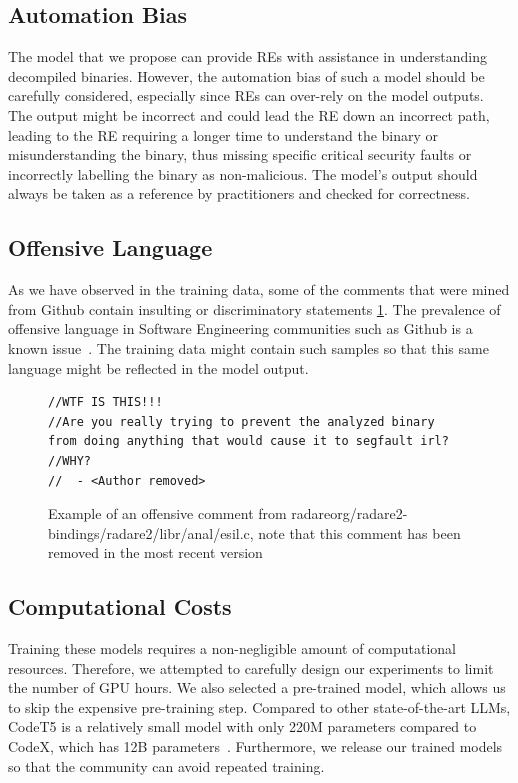 \subsection{Automation Bias}
The model that we propose can provide REs with assistance in understanding decompiled binaries. However, the automation bias of such a model should be carefully considered, especially since REs can over-rely on the model outputs. The output might be incorrect and could lead the RE down an incorrect path, leading to the RE requiring a longer time to understand the binary or misunderstanding the binary, thus missing specific critical security faults or incorrectly labelling the binary as non-malicious. The model's output should always be taken as a reference by practitioners and checked for correctness.

\subsection{Offensive Language}
As we have observed in the training data, some of the comments that were mined from Github contain insulting or discriminatory statements \ref{fig:offensive}. The prevalence of offensive language in Software Engineering communities such as Github is a known issue~\cite{OffensiveLanguage}. The training data might contain such samples so that this same language might be reflected in the model output. 

\begin{figure}[H]
  \centering
\begin{lstlisting}
//WTF IS THIS!!!
//Are you really trying to prevent the analyzed binary 
from doing anything that would cause it to segfault irl?
//WHY?
//	- <Author removed>
\end{lstlisting}
  \caption{Example of an offensive comment from radareorg/radare2-bindings/radare2/libr/anal/esil.c, note that this comment has been removed in the most recent version}
  \label{fig:offensive}
\end{figure}


\subsection{Computational Costs}
Training these models requires a non-negligible amount of computational resources. Therefore, we attempted to carefully design our experiments to limit the number of GPU hours. We also selected a pre-trained model, which allows us to skip the expensive pre-training step. Compared to other state-of-the-art LLMs, CodeT5 is a relatively small model with only 220M parameters compared to CodeX, which has 12B parameters~\cite{CodeX}. Furthermore, we release our trained models so that the community can avoid repeated training.

